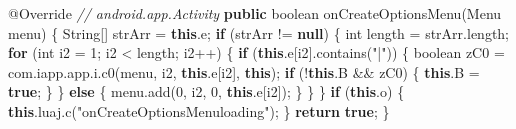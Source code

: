 \documentclass[
]{article}
\newenvironment{Shaded}{}{}
\newcommand{\AttributeTok}[1]{\textcolor[rgb]{0.49,0.56,0.16}{#1}}
\newcommand{\BuiltInTok}[1]{\textcolor[rgb]{0.00,0.50,0.00}{#1}}
\newcommand{\CommentTok}[1]{\textcolor[rgb]{0.38,0.63,0.69}{\textit{#1}}}
\newcommand{\ControlFlowTok}[1]{\textcolor[rgb]{0.00,0.44,0.13}{\textbf{#1}}}
\newcommand{\DataTypeTok}[1]{\textcolor[rgb]{0.56,0.13,0.00}{#1}}
\newcommand{\DecValTok}[1]{\textcolor[rgb]{0.25,0.63,0.44}{#1}}
\newcommand{\FunctionTok}[1]{\textcolor[rgb]{0.02,0.16,0.49}{#1}}
\newcommand{\KeywordTok}[1]{\textcolor[rgb]{0.00,0.44,0.13}{\textbf{#1}}}
\newcommand{\NormalTok}[1]{#1}
\newcommand{\OperatorTok}[1]{\textcolor[rgb]{0.40,0.40,0.40}{#1}}
\newcommand{\StringTok}[1]{\textcolor[rgb]{0.25,0.44,0.63}{#1}}
\begin{document}
\begin{Shaded}
\begin{Highlighting}[]
    \AttributeTok{@Override} \CommentTok{// android.app.Activity}
    \KeywordTok{public} \DataTypeTok{boolean} \FunctionTok{onCreateOptionsMenu}\OperatorTok{(}\BuiltInTok{Menu}\NormalTok{ menu}\OperatorTok{)} \OperatorTok{\{}
        \BuiltInTok{String}\OperatorTok{[]}\NormalTok{ strArr }\OperatorTok{=} \KeywordTok{this}\OperatorTok{.}\FunctionTok{e}\OperatorTok{;}
        \ControlFlowTok{if} \OperatorTok{(}\NormalTok{strArr }\OperatorTok{!=} \KeywordTok{null}\OperatorTok{)} \OperatorTok{\{}
            \DataTypeTok{int}\NormalTok{ length }\OperatorTok{=}\NormalTok{ strArr}\OperatorTok{.}\FunctionTok{length}\OperatorTok{;}
            \ControlFlowTok{for} \OperatorTok{(}\DataTypeTok{int}\NormalTok{ i2 }\OperatorTok{=} \DecValTok{1}\OperatorTok{;}\NormalTok{ i2 }\OperatorTok{\textless{}}\NormalTok{ length}\OperatorTok{;}\NormalTok{ i2}\OperatorTok{++)} \OperatorTok{\{}
                \ControlFlowTok{if} \OperatorTok{(}\KeywordTok{this}\OperatorTok{.}\FunctionTok{e}\OperatorTok{[}\NormalTok{i2}\OperatorTok{].}\FunctionTok{contains}\OperatorTok{(}\StringTok{"|"}\OperatorTok{))} \OperatorTok{\{}
                    \DataTypeTok{boolean}\NormalTok{ zC0 }\OperatorTok{=}\NormalTok{ com}\OperatorTok{.}\FunctionTok{iapp}\OperatorTok{.}\FunctionTok{app}\OperatorTok{.}\FunctionTok{i}\OperatorTok{.}\FunctionTok{c0}\OperatorTok{(}\NormalTok{menu}\OperatorTok{,}\NormalTok{ i2}\OperatorTok{,} \KeywordTok{this}\OperatorTok{.}\FunctionTok{e}\OperatorTok{[}\NormalTok{i2}\OperatorTok{],} \KeywordTok{this}\OperatorTok{);}
                    \ControlFlowTok{if} \OperatorTok{(!}\KeywordTok{this}\OperatorTok{.}\FunctionTok{B} \OperatorTok{\&\&}\NormalTok{ zC0}\OperatorTok{)} \OperatorTok{\{}
                        \KeywordTok{this}\OperatorTok{.}\FunctionTok{B} \OperatorTok{=} \KeywordTok{true}\OperatorTok{;}
                    \OperatorTok{\}}
                \OperatorTok{\}} \ControlFlowTok{else} \OperatorTok{\{}
\NormalTok{                    menu}\OperatorTok{.}\FunctionTok{add}\OperatorTok{(}\DecValTok{0}\OperatorTok{,}\NormalTok{ i2}\OperatorTok{,} \DecValTok{0}\OperatorTok{,} \KeywordTok{this}\OperatorTok{.}\FunctionTok{e}\OperatorTok{[}\NormalTok{i2}\OperatorTok{]);}
                \OperatorTok{\}}
            \OperatorTok{\}}
        \OperatorTok{\}}
        \ControlFlowTok{if} \OperatorTok{(}\KeywordTok{this}\OperatorTok{.}\FunctionTok{o}\OperatorTok{)} \OperatorTok{\{}
            \KeywordTok{this}\OperatorTok{.}\FunctionTok{luaj}\OperatorTok{.}\FunctionTok{c}\OperatorTok{(}\StringTok{"onCreateOptionsMenuloading"}\OperatorTok{);}
        \OperatorTok{\}}
        \ControlFlowTok{return} \KeywordTok{true}\OperatorTok{;}
    \OperatorTok{\}}


\end{Highlighting}
\end{Shaded}
\end{document}
